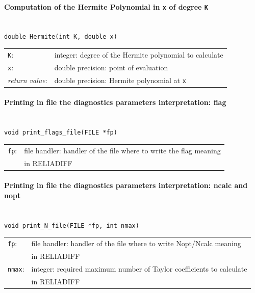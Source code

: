 \documentclass[10pt]{article}
\begin{document}
\paragraph{Computation of the Hermite Polynomial in \texttt{x} of degree \texttt{K}}\ \\

{\tt double Hermite(int K, double x)}\\
\begin{longtable}{ll}
\texttt{K}: &integer: degree of the Hermite polynomial to calculate\\
\texttt{x}: &double precision: point of evaluation\\
\emph{return value}: &double precision: Hermite polynomial at \texttt{x}\\
 \end{longtable}

\paragraph{Printing in file the diagnostics parameters interpretation: flag}\ \\

{\tt void print\_flags\_file(FILE *fp)}\\
\begin{longtable}{ll}
\texttt{fp}: &file handler: handler of the file where to write the flag meaning\\&in RELIADIFF\\
 \end{longtable}

\paragraph{Printing in file the diagnostics parameters interpretation: ncalc and nopt}\ \\

{\tt void print\_N\_file(FILE *fp, int nmax)}\\
\begin{longtable}{ll}
\texttt{fp}: &file handler: handler of the file where to write Nopt/Ncalc meaning\\&in RELIADIFF\\
\texttt{nmax}: &integer: required maximum number of Taylor coefficients to calculate\\&in RELIADIFF\\
 \end{longtable}
\end{document}
